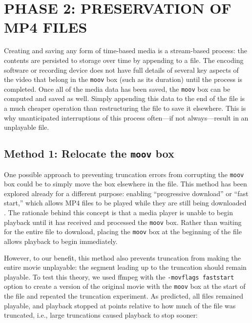 %
%
%
%
%

\chapter{\uppercase{Phase 2: Preservation of MP4 Files}}

Creating and saving any form of time-based media is a stream-based process: the contents are persisted to storage over time by appending to a file. The encoding software or recording device does not have full details of several key aspects of the video that belong in the \texttt{moov} box (such as its duration) until the process is completed. Once all of the media data has been saved, the \texttt{moov} box can be computed and saved as well. Simply appending this data to the end of the file is a much cheaper operation than restructuring the file to save it elsewhere. This is why unanticipated interruptions of this process often---if not always---result in an unplayable file.

\section{Method 1: Relocate the \texttt{moov} box}

One possible approach to preventing truncation errors from corrupting the \texttt{moov} box could be to simply move the box elsewhere in the file. This method has been explored already for a different purpose: enabling ``progressive download'' or ``fast start,'' which allows MP4 files to be played while they are still being downloaded \cite{pandey2020}. The rationale behind this concept is that a media player is unable to begin playback until it has received and processed the \texttt{moov} box. Rather than waiting for the entire file to download, placing the \texttt{moov} box at the beginning of the file allows playback to begin immediately.

However, to our benefit, this method also prevents truncation from making the entire movie unplayable: the segment leading up to the truncation should remain playable. To test this theory, we used ffmpeg with the \texttt{-movflags faststart} option to create a version of the original movie with the \texttt{moov} box at the start of the file and repeated the truncation experiment. As predicted, all files remained playable, and playback stopped at points relative to how much of the file was truncated, i.e., large truncations caused playback to stop sooner:

